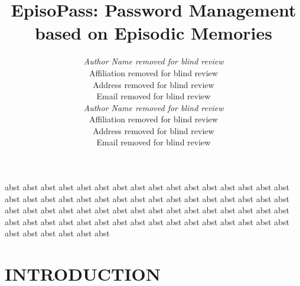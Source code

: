 \documentclass{article}
\begin{document}

\title{EpisoPass: Password Management based on Episodic Memories}

\author{
\parbox[t]{9cm}{\centering
	     {\em Author Name removed for blind review}\\
	     Affiliation removed for blind review\\
	     Address removed for blind review\\
	     Email removed for blind review}
\parbox[t]{9cm}{\centering
	     {\em Author Name removed for blind review}\\
	     Affiliation removed for blind review\\
	     Address removed for blind review\\
	     Email removed for blind review}
}

\maketitle

\abstract
abst abst abst abst abst abst abst abst abst abst abst abst abst abst 
abst abst abst abst abst abst abst abst abst abst abst abst abst abst 
abst abst abst abst abst abst abst abst abst abst abst abst abst abst 
abst abst abst abst abst abst abst abst abst abst abst abst abst abst 
abst abst abst abst abst abst abst abst abst abst abst abst abst abst 





\section{INTRODUCTION}

% 
\end{document}
